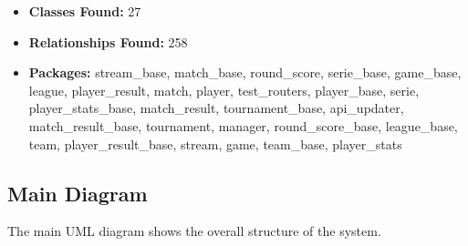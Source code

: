 \documentclass[11pt,a4paper]{article}
\begin{document}
\begin{itemize}
    \item \textbf{Classes Found:} 27
    \item \textbf{Relationships Found:} 258
    \item \textbf{Packages:} stream\_base, match\_base, round\_score, serie\_base, game\_base, league, player\_result, match, player, test\_routers, player\_base, serie, player\_stats\_base, match\_result, tournament\_base, api\_updater, match\_result\_base, tournament, manager, round\_score\_base, league\_base, team, player\_result\_base, stream, game, team\_base, player\_stats
\end{itemize}

\subsection{Main Diagram}

The main UML diagram shows the overall structure of the system.
\end{document}
